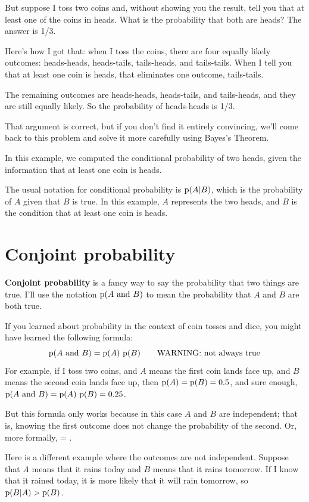 \documentclass[12pt]{book}
\theoremstyle{exercise}
\begin{document}
But suppose I toss two coins and, without showing you the result, tell you that at least one of the coins in heads.
What is the probability that both are heads?
The answer is 1/3.

Here's how I got that: when I toss the coins, there are four equally likely outcomes: heads-heads, heads-tails, tails-heads, and tails-tails.
When I tell you that at least one coin is heads, that eliminates one outcome, tails-tails.

The remaining outcomes are heads-heads, heads-tails, and tails-heads, and they are still equally likely.
So the probability of heads-heads is 1/3.

That argument is correct, but if you don't find it entirely convincing, we'll come back to this problem and solve it more carefully using Bayes's Theorem.

In this example, we computed the conditional probability of two heads, given the information that at least one coin is heads.

The usual notation for conditional probability is $\mathrm{p}(A|B)$, which
is the probability of $A$ given that $B$ is true.  In this
example, $A$ represents the two heads, and $B$ is the condition that at least one coin is heads.


\section{Conjoint probability}

{\bf Conjoint probability} is a fancy way to say the probability that
two things are true.  I'll use the notation $\mathrm{p}(A ~\mathrm{and}~ B)$ to mean the
probability that $A$ and $B$ are both true.


If you learned about probability in the context of coin tosses and
dice, you might have learned the following formula:
%
\[ \mathrm{p}(A ~\mathrm{and}~ B) = \mathrm{p}(A)~\mathrm{p}(B) \quad\quad\mbox{WARNING: not always true}\]
%
For example, if I toss two coins, and $A$ means the first coin lands
face up, and $B$ means the second coin lands face up, then $\mathrm{p}(A) =
\mathrm{p}(B) = 0.5$, and sure enough, $\mathrm{p}(A ~\mathrm{and}~ B) = \mathrm{p}(A)~\mathrm{p}(B) = 0.25$.

But this formula only works because in this case $A$ and $B$ are
independent; that is, knowing the first outcome does
not change the probability of the second.  Or, more formally,
 = .

Here is a different example where the outcomes are not independent.
Suppose that $A$ means that it rains today and $B$ means that it
rains tomorrow.  If I know that it rained today, it is more likely
that it will rain tomorrow, so $\mathrm{p}(B|A) > \mathrm{p}(B)$.
\end{document}
